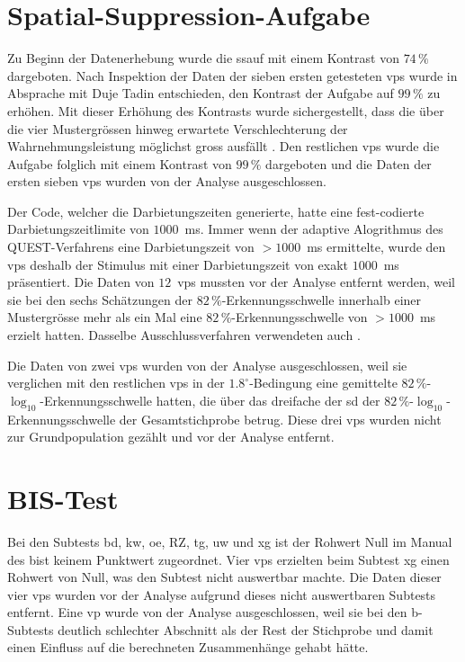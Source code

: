 \documentclass[11pt, twoside, a4paper]{book}		%
\begin{document}
\section{Spatial-Suppression-Aufgabe}
Zu Beginn der Datenerhebung wurde die \gls{ssauf} mit einem Kontrast von $74\,\%$ dargeboten. Nach Inspektion der Daten der sieben ersten getesteten \glspl{vp} wurde in Absprache mit Duje Tadin entschieden, den Kontrast der Aufgabe auf $99\,\%$ zu erhöhen. Mit dieser Erhöhung des Kontrasts wurde sichergestellt, dass die über die vier Mustergrössen hinweg erwartete Verschlechterung der Wahrnehmungsleistung möglichst gross ausfällt \citep[für den Zusammenhang zwischen Kontrast und Wahrnehmungsleistung siehe][]{Tadin2003}. Den restlichen \glspl{vp} wurde die Aufgabe folglich mit einem Kontrast von $99\,\%$ dargeboten und die Daten der ersten sieben \glspl{vp} wurden von der Analyse ausgeschlossen.

Der Code, welcher die Darbietungszeiten generierte, hatte eine fest-codierte Darbietungszeitlimite von $1000$~ms. Immer wenn der adaptive Alogrithmus des QUEST-Verfahrens \citep{Watson1983} eine Darbietungszeit von $> 1000$~ms ermittelte, wurde den \glspl{vp} deshalb der Stimulus mit einer Darbietungszeit von exakt $1000$~ms präsentiert. 
Die Daten von $12$~\glspl{vp} mussten vor der Analyse entfernt werden, weil sie bei den sechs Schätzungen der $82\,\%$-Er\-ken\-nungs\-schwel\-le innerhalb einer Mustergrösse mehr als ein Mal eine $82\,\%$-Er\-ken\-nungs\-schwel\-le von $> 1000$~ms erzielt hatten. Dasselbe Ausschlussverfahren verwendeten auch \citet{Melnick2013}.

Die Daten von zwei \glspl{vp} wurden von der Analyse ausgeschlossen, weil sie verglichen mit den restlichen \glspl{vp} in der $1.8^{\circ}$-Be\-ding\-ung eine gemittelte $82\,\%$-$\log_{10}$-Er\-ken\-nungs\-schwel\-le hatten, die über das dreifache der \gls{sd} der $82\,\%$-$\log_{10}$-Er\-ken\-nungs\-schwel\-le der Gesamtstichprobe betrug. Diese drei \glspl{vp} wurden nicht zur Grundpopulation gezählt und vor der Analyse entfernt.


\section{BIS-Test}
Bei den Subtests \gls{bd}, \gls{kw}, \gls{oe}, \gls{RZ}, \gls{tg}, \gls{uw} und \gls{xg} ist der Rohwert Null im Manual des \gls{bist} \citep{Jaeger1997} keinem Punktwert zugeordnet. Vier \glspl{vp} erzielten beim Subtest \gls{xg} einen Rohwert von Null, was den Subtest nicht auswertbar machte. Die Daten dieser vier \glspl{vp} wurden vor der Analyse aufgrund dieses nicht auswertbaren Subtests entfernt. Eine \gls{vp} wurde von der Analyse ausgeschlossen, weil sie bei den \gls{b}-Subtests deutlich schlechter Abschnitt als der Rest der Stichprobe und damit einen Einfluss auf die berechneten Zusammenhänge gehabt hätte.
\end{document}
